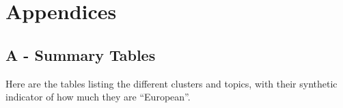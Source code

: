 \documentclass[]{elsarticle} %
\begin{document}
\newpage

\hypertarget{appendices}{%
\section*{Appendices}\label{appendices}}

\hypertarget{a---summary-tables}{%
\subsection*{A - Summary Tables}\label{a---summary-tables}}

Here are the tables listing the different clusters and topics, with
their synthetic indicator of how much they are ``European''.
\end{document}
